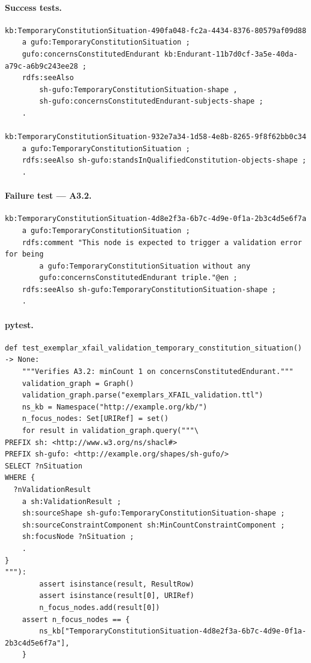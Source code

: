 \documentclass[12pt,a4paper]{article}
\begin{document}
\paragraph{Success tests.}

\begin{lstlisting}[style=turtlestyle]
kb:TemporaryConstitutionSituation-490fa048-fc2a-4434-8376-80579af09d88
    a gufo:TemporaryConstitutionSituation ;
    gufo:concernsConstitutedEndurant kb:Endurant-11b7d0cf-3a5e-40da-a79c-a6b9c243ee28 ;
    rdfs:seeAlso
        sh-gufo:TemporaryConstitutionSituation-shape ,
        sh-gufo:concernsConstitutedEndurant-subjects-shape ;
    .

kb:TemporaryConstitutionSituation-932e7a34-1d58-4e8b-8265-9f8f62bb0c34
    a gufo:TemporaryConstitutionSituation ;
    rdfs:seeAlso sh-gufo:standsInQualifiedConstitution-objects-shape ;
    .
\end{lstlisting}

\paragraph{Failure test --- A3.2.}

\begin{lstlisting}[style=turtlestyle]
kb:TemporaryConstitutionSituation-4d8e2f3a-6b7c-4d9e-0f1a-2b3c4d5e6f7a
    a gufo:TemporaryConstitutionSituation ;
    rdfs:comment "This node is expected to trigger a validation error for being
        a gufo:TemporaryConstitutionSituation without any
        gufo:concernsConstitutedEndurant triple."@en ;
    rdfs:seeAlso sh-gufo:TemporaryConstitutionSituation-shape ;
    .
\end{lstlisting}

\paragraph{pytest.}

\begin{lstlisting}[style=pythonstyle]
def test_exemplar_xfail_validation_temporary_constitution_situation() -> None:
    """Verifies A3.2: minCount 1 on concernsConstitutedEndurant."""
    validation_graph = Graph()
    validation_graph.parse("exemplars_XFAIL_validation.ttl")
    ns_kb = Namespace("http://example.org/kb/")
    n_focus_nodes: Set[URIRef] = set()
    for result in validation_graph.query("""\
PREFIX sh: <http://www.w3.org/ns/shacl#>
PREFIX sh-gufo: <http://example.org/shapes/sh-gufo/>
SELECT ?nSituation
WHERE {
  ?nValidationResult
    a sh:ValidationResult ;
    sh:sourceShape sh-gufo:TemporaryConstitutionSituation-shape ;
    sh:sourceConstraintComponent sh:MinCountConstraintComponent ;
    sh:focusNode ?nSituation ;
    .
}
"""):
        assert isinstance(result, ResultRow)
        assert isinstance(result[0], URIRef)
        n_focus_nodes.add(result[0])
    assert n_focus_nodes == {
        ns_kb["TemporaryConstitutionSituation-4d8e2f3a-6b7c-4d9e-0f1a-2b3c4d5e6f7a"],
    }
\end{lstlisting}
\end{document}
